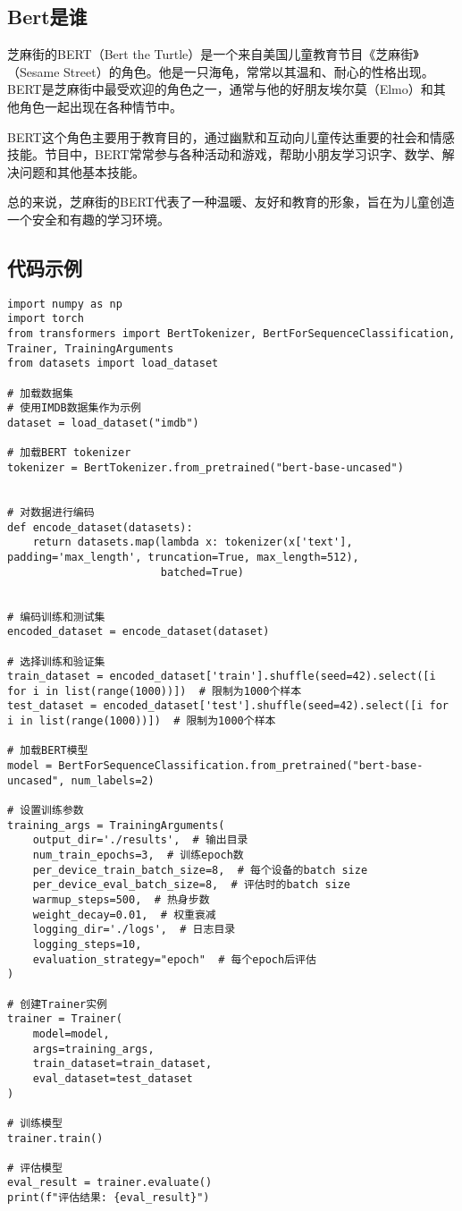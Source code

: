 \subsection{Bert是谁}
芝麻街的BERT（Bert the Turtle）是一个来自美国儿童教育节目《芝麻街》（Sesame Street）的角色。他是一只海龟，常常以其温和、耐心的性格出现。BERT是芝麻街中最受欢迎的角色之一，通常与他的好朋友埃尔莫（Elmo）和其他角色一起出现在各种情节中。

BERT这个角色主要用于教育目的，通过幽默和互动向儿童传达重要的社会和情感技能。节目中，BERT常常参与各种活动和游戏，帮助小朋友学习识字、数学、解决问题和其他基本技能。

总的来说，芝麻街的BERT代表了一种温暖、友好和教育的形象，旨在为儿童创造一个安全和有趣的学习环境。

\subsection*{代码示例}
\begin{lstlisting}
import numpy as np
import torch
from transformers import BertTokenizer, BertForSequenceClassification, Trainer, TrainingArguments
from datasets import load_dataset

# 加载数据集
# 使用IMDB数据集作为示例
dataset = load_dataset("imdb")

# 加载BERT tokenizer
tokenizer = BertTokenizer.from_pretrained("bert-base-uncased")


# 对数据进行编码
def encode_dataset(datasets):
    return datasets.map(lambda x: tokenizer(x['text'], padding='max_length', truncation=True, max_length=512),
                        batched=True)


# 编码训练和测试集
encoded_dataset = encode_dataset(dataset)

# 选择训练和验证集
train_dataset = encoded_dataset['train'].shuffle(seed=42).select([i for i in list(range(1000))])  # 限制为1000个样本
test_dataset = encoded_dataset['test'].shuffle(seed=42).select([i for i in list(range(1000))])  # 限制为1000个样本

# 加载BERT模型
model = BertForSequenceClassification.from_pretrained("bert-base-uncased", num_labels=2)

# 设置训练参数
training_args = TrainingArguments(
    output_dir='./results',  # 输出目录
    num_train_epochs=3,  # 训练epoch数
    per_device_train_batch_size=8,  # 每个设备的batch size
    per_device_eval_batch_size=8,  # 评估时的batch size
    warmup_steps=500,  # 热身步数
    weight_decay=0.01,  # 权重衰减
    logging_dir='./logs',  # 日志目录
    logging_steps=10,
    evaluation_strategy="epoch"  # 每个epoch后评估
)

# 创建Trainer实例
trainer = Trainer(
    model=model,
    args=training_args,
    train_dataset=train_dataset,
    eval_dataset=test_dataset
)

# 训练模型
trainer.train()

# 评估模型
eval_result = trainer.evaluate()
print(f"评估结果: {eval_result}")

\end{lstlisting}


